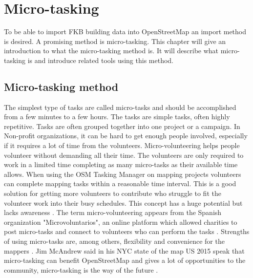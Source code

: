 
\chapter{Micro-tasking}\label{ch:microtask}
To be able to import FKB building data into OpenStreetMap an import method is desired. A promising method is micro-tasking. This chapter will give an introduction to what the micro-tasking method is. It will describe what micro-tasking is and introduce related tools using this method. 

\section{Micro-tasking method}
The simplest type of tasks are called micro-tasks and should be accomplished from a few minutes to a few hours. The tasks are simple tasks, often highly repetitive. Tasks are often grouped together into one project or a campaign. In Non-profit organizations, it can be hard to get enough people involved, especially if it requires a lot of time from the volunteers. Micro-volunteering helps people volunteer without demanding all their time. The volunteers are only required to work in a limited time completing as many micro-tasks as their available time allows. When using the OSM Tasking Manager on mapping projects volunteers can complete mapping tasks within a reasonable time interval. This is a good solution for getting more volunteers to contribute who struggle to fit the volunteer work into their busy schedules. This concept has a huge potential but lacks awareness \cite{Bernstein}. The term micro-volunteering appears from the Spanish organization "Microvoluntarios", an online platform which allowed charities to post micro-tasks and connect to volunteers who can perform the tasks \cite{Madalena}.  Strengths of using micro-tasks are, among others, flexibility and convenience for the mappers \cite{Madalena}. Jim McAndrew said in his NYC state of the map US 2015 speak that micro-tasking can benefit OpenStreetMap and gives a lot of opportunities to the community, micro-tasking is the way of the future \cite{McAndrew2015}.  

